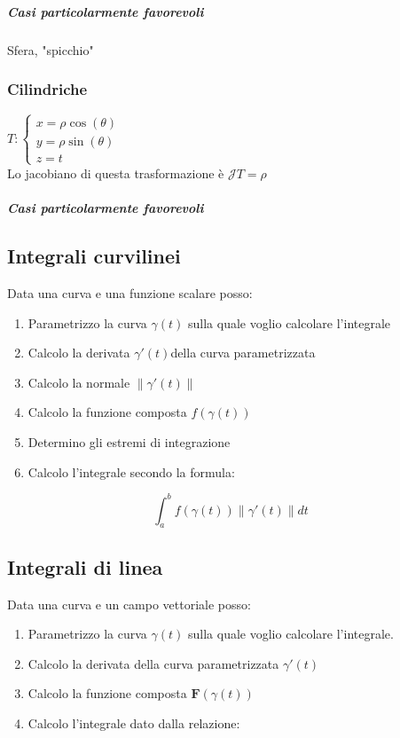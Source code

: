 \documentclass[10pt,a4paper]{report}
\newcommand{\norm}[1]{\left\lVert {#1} \right\rVert}
\begin{document}
				\subparagraph{Casi particolarmente favorevoli}
                Sfera, "spicchio"
                
			\subsubsection{Cilindriche}
			$ T: \begin{cases} 
			x=\rho \cos(\theta) \\ 
			y=\rho \sin(\theta) \\
			z=t
			\end{cases} $
			\\
			Lo jacobiano di questa trasformazione è $\mathcal{J}T=\rho $
			
				\subparagraph{Casi particolarmente favorevoli}
		

		\subsection*{Integrali \textbf{curvilinei}}
			Data una curva e una funzione scalare posso:
			\begin{enumerate}
				\item Parametrizzo la curva $ \gamma(t) $ sulla quale voglio calcolare l'integrale
				\item Calcolo la derivata $ \gamma ' (t) $della curva parametrizzata
                \item Calcolo la normale $ \norm{\gamma '(t)} $
				\item Calcolo la funzione composta $ f(\gamma (t)) $
				\item Determino gli estremi di integrazione
				\item Calcolo l'integrale secondo la formula:
			\end{enumerate}
		
		\[ \int_{a}^{b} f(\gamma (t)) \norm{\gamma '(t)} dt\]
		
		
		\subsection*{Integrali di \textbf{linea}}
		Data una curva e un campo vettoriale posso:
			\begin{enumerate}
				\item Parametrizzo la curva $ \gamma(t) $ sulla quale voglio calcolare l'integrale. 
				\item Calcolo la derivata della curva parametrizzata $ \gamma ' (t) $ 
				\item Calcolo la funzione composta $ \mathbf{F}(\gamma (t)) $
				\item Calcolo l'integrale dato dalla relazione:
				\end{enumerate}
			
\end{document}
